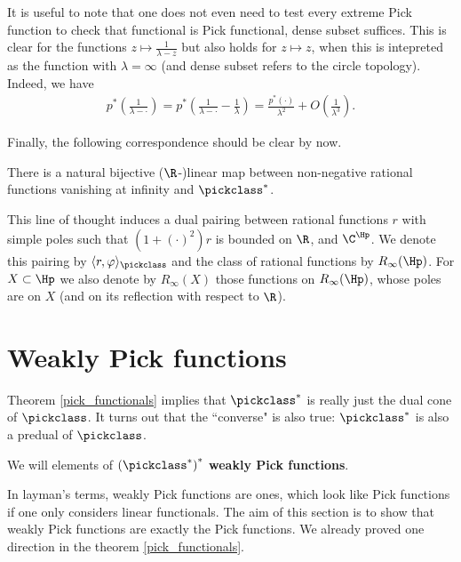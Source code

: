 It is useful to note that one does not even need to test every extreme Pick function to check that functional is Pick functional, dense subset suffices. This is clear for the functions $z \mapsto \frac{1}{\lambda - z}$ but also holds for $z \mapsto z$, when this is intepreted as the function with $\lambda = \infty$ (and dense subset refers to the circle topology). Indeed, we have
\begin{align*}
	p^{*}\left(\frac{1}{\lambda - \cdot}\right) = p^{*}\left(\frac{1}{\lambda - \cdot} - \frac{1}{\lambda}\right) = \frac{p^{*}(\cdot)}{\lambda^2} + O\left(\frac{1}{\lambda^3}\right).
\end{align*}

Finally, the following correspondence should be clear by now.

\begin{prop}
	There is a natural bijective ($\R$-)linear map between non-negative rational functions vanishing at infinity and $\pickclass^{*}$.
\end{prop}

This line of thought induces a dual pairing between rational functions $r$ with simple poles such that $(1 + (\cdot)^2) r$ is bounded on $\R$, and $\C^{\Hp}$. We denote this pairing by $\langle r, \varphi \rangle_{\pickclass}$ and the class of rational functions by $R_{\infty}(\Hp)$. For $X \subset \Hp$ we also denote by $R_{\infty}(X)$ those functions on $R_{\infty}(\Hp)$, whose poles are on $X$ (and on its reflection with respect to $\R$).

\section{Weakly Pick functions}

Theorem \ref{pick_functionals} implies that $\pickclass^{*}$ is really just the dual cone of $\pickclass$. It turns out that the ``converse" is also true: $\pickclass^{*}$ is also a predual of $\pickclass$.

\begin{maar}
	We will elements of $\left(\pickclass^{*}\right)^{*}$ \textbf{weakly Pick functions}.
\end{maar}

In layman's terms, weakly Pick functions are ones, which look like Pick functions if one only considers linear functionals. The aim of this section is to show that weakly Pick functions are exactly the Pick functions. We already proved one direction in the theorem \ref{pick_functionals}. 

